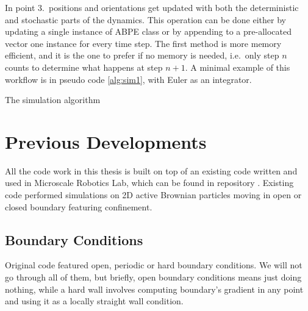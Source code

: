 \documentclass[../../master_thesis_np.tex]{subfiles}
\begin{document}
	In point 3.\ positions and orientations get updated with both the deterministic and stochastic parts of the dynamics. This operation can be done either by updating a single instance of ABPE class or by appending to a pre-allocated vector one instance for every time step. The first method is more memory efficient, and it is the one to prefer if no memory is needed, i.e.\ only step $n$ counts to determine what happens at step $n+1$. A minimal example of this workflow is in pseudo code \ref{alg:sim1}, with Euler as an integrator.
	
	\begin{algorithm}
		\caption{The simulation algorithm} \label{alg:sim1}	
		\begin{algorithmic}[1]
			\EndFor
			\EndFor
			\EndFor
		\end{algorithmic}
	\end{algorithm}  
	
	\section{Previous Developments}
	All the code work in this thesis is built on top of an existing code written and used in Microscale Robotics Lab, which can be found in repository \cite{sharma_simulations_2023}. Existing code performed simulations on 2D active Brownian particles moving in open or closed boundary featuring confinement. 
	
	\subsection{Boundary Conditions}
	Original code featured open, periodic or hard boundary conditions. We will not go through all of them, but briefly, open boundary conditions means just doing nothing, while a hard wall involves computing boundary's gradient in any point and using it as a locally straight wall condition.
	
\end{document}
